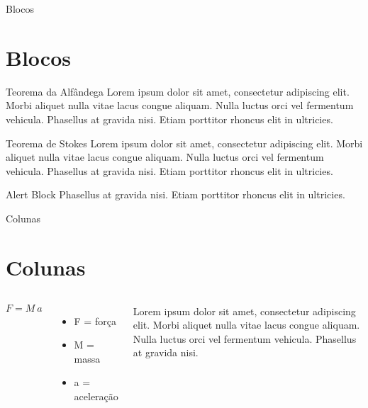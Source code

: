 \documentclass{beamer}
\begin{document}
\begin{frame}{Blocos}
    \section{Blocos}
    \begin{block}{Teorema da Alfândega}
        Lorem ipsum dolor sit amet, consectetur adipiscing elit. Morbi aliquet nulla vitae lacus congue aliquam. Nulla luctus orci vel fermentum vehicula. Phasellus at gravida nisi. Etiam porttitor rhoncus elit in ultricies. 
    \end{block}
    \begin{exampleblock}{Teorema de Stokes}
        Lorem ipsum dolor sit amet, consectetur adipiscing elit. Morbi aliquet nulla vitae lacus congue aliquam. Nulla luctus orci vel fermentum vehicula. Phasellus at gravida nisi. Etiam porttitor rhoncus elit in ultricies. 
    \end{exampleblock}
    \begin{alertblock}{Alert Block}
     Phasellus at gravida nisi. Etiam porttitor rhoncus elit in ultricies. 
    \end{alertblock}
\end{frame}

\begin{frame}{Colunas}
    \section{Colunas}
    \begin{columns}
        $$F = M \ a$$
        \begin{itemize}
            \item F = força
            \item M = massa
            \item a = aceleração
        \end{itemize}
        
        Lorem ipsum dolor sit amet, consectetur adipiscing elit. Morbi aliquet nulla vitae lacus congue aliquam. Nulla luctus orci vel fermentum vehicula. Phasellus at gravida nisi.
        
    \end{columns}
\end{frame} 
\end{document}

